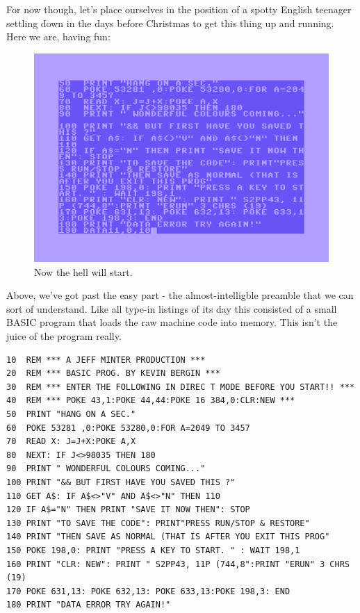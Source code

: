 For now though, let's place ourselves in the position of a spotty English teenager settling down in the days before Christmas to get
this thing up and running. Here we are, having fun: 

\begin{figure}[H]
    \centering
    \begin{adjustbox}{width=8cm,center}
      \includegraphics[width=12cm]{src/listing/typing.png}%
    \end{adjustbox}
\caption*{Now the hell will start.}
\end{figure}

Above, we've got past the easy part - the almost-intelligble preamble that we can sort of understand.  Like all type-in listings of its day this consisted of a small BASIC program
that loads the raw machine code into memory. This isn't the juice of the program really.  

\lstset{style=C64BasicStyle}
\begin{lstlisting}
10  REM *** A JEFF MINTER PRODUCTION ***
20  REM *** BASIC PROG. BY KEVIN BERGIN ***
30  REM *** ENTER THE FOLLOWING IN DIREC T MODE BEFORE YOU START!! ***
40  REM *** POKE 43,1:POKE 44,44:POKE 16 384,0:CLR:NEW ***
50  PRINT "HANG ON A SEC."
60  POKE 53281 ,0:POKE 53280,0:FOR A=2049 TO 3457
70  READ X: J=J+X:POKE A,X
80  NEXT: IF J<>98035 THEN 180
90  PRINT " WONDERFUL COLOURS COMING..."
100 PRINT "&& BUT FIRST HAVE YOU SAVED THIS ?"
110 GET A$: IF A$<>"V" AND A$<>"N" THEN 110
120 IF A$="N" THEN PRINT "SAVE IT NOW THEN": STOP
130 PRINT "TO SAVE THE CODE": PRINT"PRESS RUN/STOP & RESTORE"
140 PRINT "THEN SAVE AS NORMAL (THAT IS AFTER YOU EXIT THIS PROG"
150 POKE 198,0: PRINT "PRESS A KEY TO START. " : WAIT 198,1
160 PRINT "CLR: NEW": PRINT " S2PP43, 11P (744,8":PRINT "ERUN" 3 CHRS (19)
170 POKE 631,13: POKE 632,13: POKE 633,13:POKE 198,3: END
180 PRINT "DATA ERROR TRY AGAIN!"
\end{lstlisting}


